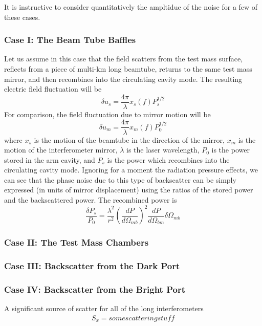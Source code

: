 It is instructive to consider quantitatively the ampltidue of the noise for a few of
these cases.
\subsubsection{Case I: The Beam Tube Baffles}
Let us assume in this case that the field scatters from the test mass surface,
reflects from a piece of multi-km long beamtube, returns to the same test mass
mirror, and then recombines into the circulating cavity mode. The resulting electric
field fluctuation will be
\begin{equation}
\delta u_{s} = \frac{4 \pi}{\lambda} x_{s}(f) P_s^{1/2}
\end{equation}
For comparison, the field fluctuation due to mirror motion will be
\begin{equation}
\delta u_{m} = \frac{4 \pi}{\lambda} x_{m}(f) P_0^{1/2}
\end{equation}
where $x_s$ is the motion of the beamtube in the direction of the mirror, $x_m$
is the motion of the interferometer mirror, $\lambda$ is the laser wavelength,
$P_0$ is the power stored in the arm cavity, and $P_s$ is the power which
recombines into the circulating cavity mode. Ignoring for a moment the radiation
pressure effects, we can see that the phase noise due to this type of backscatter
can be simply expressed (in units of mirror displacement) using the ratios of
the stored power and the backscattered power. The recombined power is
\begin{equation}
\frac{\delta P_s}{P_0} = \frac{\lambda^2}{r^2} \left( \frac{dP}{d\Omega_{mb}}\right)^2 \frac{dP}{d\Omega_{bm}} \delta \Omega_{mb}
\end{equation}


\subsubsection{Case II: The Test Mass Chambers}


\subsubsection{Case III: Backscatter from the Dark Port}


\subsubsection{Case IV: Backscatter from the Bright Port}
A significant source of scatter for all of the long interferometers
\begin{align}
S_x = some scattering stuff
\end{align}

